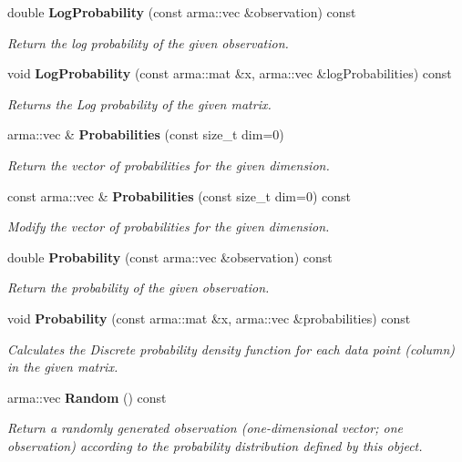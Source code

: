 \begin{DoxyCompactItemize}
double \textbf{ Log\+Probability} (const arma\+::vec \&observation) const
\begin{DoxyCompactList}\small\item\em Return the log probability of the given observation. \end{DoxyCompactList}\item 
void \textbf{ Log\+Probability} (const arma\+::mat \&x, arma\+::vec \&log\+Probabilities) const
\begin{DoxyCompactList}\small\item\em Returns the Log probability of the given matrix. \end{DoxyCompactList}\item 
arma\+::vec \& \textbf{ Probabilities} (const size\+\_\+t dim=0)
\begin{DoxyCompactList}\small\item\em Return the vector of probabilities for the given dimension. \end{DoxyCompactList}\item 
const arma\+::vec \& \textbf{ Probabilities} (const size\+\_\+t dim=0) const
\begin{DoxyCompactList}\small\item\em Modify the vector of probabilities for the given dimension. \end{DoxyCompactList}\item 
double \textbf{ Probability} (const arma\+::vec \&observation) const
\begin{DoxyCompactList}\small\item\em Return the probability of the given observation. \end{DoxyCompactList}\item 
void \textbf{ Probability} (const arma\+::mat \&x, arma\+::vec \&probabilities) const
\begin{DoxyCompactList}\small\item\em Calculates the Discrete probability density function for each data point (column) in the given matrix. \end{DoxyCompactList}\item 
arma\+::vec \textbf{ Random} () const
\begin{DoxyCompactList}\small\item\em Return a randomly generated observation (one-\/dimensional vector; one observation) according to the probability distribution defined by this object. \end{DoxyCompactList}\item 

\end{DoxyCompactItemize}
